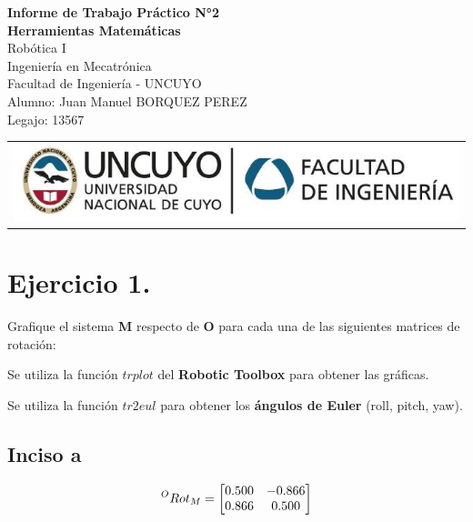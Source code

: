 \documentclass[a4paper,12pt]{article}
\begin{document}
\begin{titlepage}
    \centering
    \vspace*{5cm}
    {\Huge\bfseries Informe de Trabajo Práctico N°2}\\
    \vspace{0.2cm}
    {\Large \textbf{Herramientas Matemáticas}}\\
    \vspace{0.5cm}
    {\Large Robótica I}\\
    \vspace{0.5 cm}
    {\Large Ingeniería en Mecatrónica}\\
    \vspace{0.2 cm}
    {\Large Facultad de Ingeniería - UNCUYO}\\
    \vspace{1.5cm}
    Alumno: Juan Manuel BORQUEZ PEREZ\\
    Legajo: 13567\\
    \vfill
    {\begin{tabular}{@{}c@{}}\includegraphics[scale=0.4]{escudo.PNG}\end{tabular}}\hspace{10pt}
\end{titlepage}

\section{Ejercicio 1.}
Grafique el sistema \textbf{M} respecto de \textbf{O} para cada una de las siguientes matrices
de rotación:

Se utiliza la función $trplot$ del \textbf{Robotic Toolbox} para obtener las gráficas.

Se utiliza la función $tr2eul$ para obtener los \textbf{ángulos de Euler} (roll, pitch, yaw).

\subsection{Inciso a}
\begin{equation*}
    \prescript{O}{}{Rot_M} = 
    \begin{bmatrix}
        0.500 & -0.866\\
        0.866 & 0.500
    \end{bmatrix}
\end{equation*}
\end{document}
